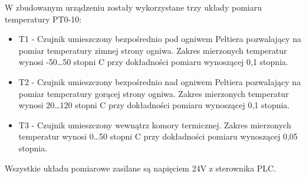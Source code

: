 \documentclass[oneside]{mgr}
\begin{document}
W zbudowanym urządzeniu zostały wykorzystane trzy układy pomiaru temperatury PT0-10:
\begin{itemize}
    \item T1 - Czujnik umieszczony bezpośrednio pod ogniwem Peltiera pozwalający na pomiar temperatury zimnej strony ogniwa. Zakres mierzonych temperatur wynosi -50\dots50 stopni C przy dokładności pomiaru wynoszącej 0,1 stopnia.
    \item T2 - Czujnik umieszczony bezpośrednio nad ogniwem Peltiera pozwalający na pomiar temperatury gorącej strony ogniwa. Zakres mierzonych temperatur wynosi 20\dots120 stopni C przy dokładności pomiaru wynoszącej 0,1 stopnia.
    \item T3 - Czujnik umieszczony wewnątrz komory termicznej. Zakres mierzonych temperatur wynosi 0\dots50 stopni C przy dokładności pomiaru wynoszącej 0,05 stopnia.
\end{itemize}
Wszystkie układu pomiarowe zasilane są napięciem 24V z sterownika PLC.
\newpage
\end{document}
